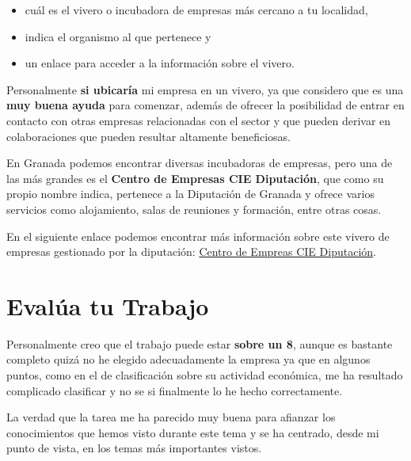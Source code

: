 \begin{itemize}
    \item cuál es el vivero o incubadora de empresas más cercano a tu localidad,
    \item indica el organismo al que pertenece y
    \item un enlace para acceder a la información sobre el vivero.
\end{itemize}

Personalmente \textbf{si ubicaría} mi empresa en un vivero, ya que considero que es una \textbf{muy buena ayuda} para comenzar, además de ofrecer la posibilidad de entrar en contacto con otras empresas relacionadas con el sector y que pueden derivar en colaboraciones que pueden resultar altamente beneficiosas.

En Granada podemos encontrar diversas incubadoras de empresas, pero una de las más grandes es el \textbf{Centro de Empresas CIE Diputación}, que como su propio nombre indica, pertenece a la Diputación de Granada y ofrece varios servicios como alojamiento, salas de reuniones y formación, entre otras cosas.

En el siguiente enlace podemos encontrar más información sobre este vivero de empresas gestionado por la diputación: \href{https://www.granadaempresas.es/centro-empresas-cie-diputacion/}{Centro de Empreas CIE Diputación}.

\section{Evalúa tu Trabajo}
Personalmente creo que el trabajo puede estar \textbf{sobre un 8}, aunque es bastante completo quizá no he elegido adecuadamente la empresa ya que en algunos puntos, como en el de clasificación sobre su actividad económica, me ha resultado complicado clasificar y no se si finalmente lo he hecho correctamente.

La verdad que la tarea me ha parecido muy buena para afianzar los conocimientos que hemos visto durante este tema y se ha centrado, desde mi punto de vista, en los temas más importantes vistos.



%
%

